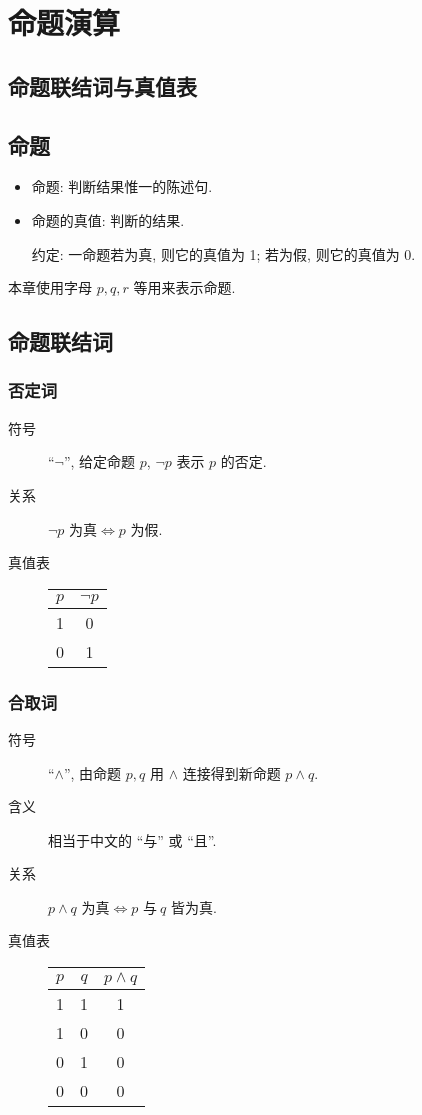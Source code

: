 \documentclass[
    color=black,
    device=normal,
    lang=cn
]{elegantnote}
\begin{document}
\section{命题演算}
\subsection{命题联结词与真值表}
\subsection{命题}
\begin{itemize}
    \item 命题: 判断结果惟一的陈述句.
    \item 命题的真值: 判断的结果.

          约定: 一命题若为真, 则它的真值为 1; 若为假, 则它的真值为 0.
\end{itemize}
本章使用字母 $p,q,r$ 等用来表示命题.
\subsection{命题联结词}
\subsubsection{否定词}
\begin{description}
    \item[符号] ``$\lnot$'', 给定命题 $p$, $\lnot p$ 表示 $p$ 的否定.
    \item[关系] $\lnot p\text{ 为真}\Leftrightarrow p\text{ 为假}$.
    \item[真值表]
        \begin{tabular}{c|c}
            $p$ & $\lnot p$ \\
            \hline
            1   & 0         \\
            0   & 1
        \end{tabular}
\end{description}
\subsubsection{合取词}
\begin{description}
    \item[符号] ``$\land$'', 由命题 $p,q$ 用 $\land$ 连接得到新命题 $p\land q$.
    \item[含义] 相当于中文的 ``与'' 或 ``且''.
    \item[关系] $p\land q\text{ 为真}\Leftrightarrow p\text{ 与}\ q\text{ 皆为真}$.
    \item[真值表]
        \begin{tabular}{c|c|c}
            $p$ & $q$ & $p\land q$ \\
            \hline
            1   & 1   & 1          \\
            1   & 0   & 0          \\
            0   & 1   & 0          \\
            0   & 0   & 0
        \end{tabular}
\end{description}
\end{document}
